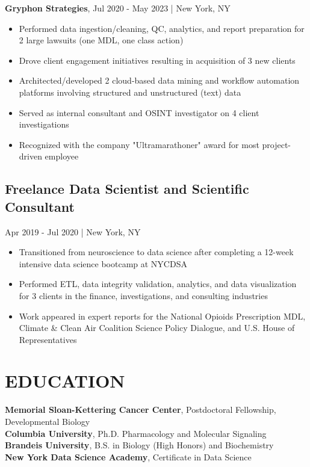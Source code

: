 \documentclass[11pt]{article}
\newenvironment{myitemize}
{ \begin{itemize}
	\setlength{\itemsep}{0pt}
	\setlength{\parskip}{0pt}
	\setlength{\parsep}{0pt}     }
{ \end{itemize}                  }
\begin{document}
{\bfseries Gryphon Strategies}, Jul 2020 - May 2023 | New York, NY
\begin{myitemize}
	\item Performed data ingestion/cleaning, QC, analytics, and report preparation for 2 large lawsuits (one MDL, one class action)
	\item Drove client engagement initiatives resulting in acquisition of 3 new clients
	\item Architected/developed 2 cloud-based data mining and workflow automation platforms involving structured and unstructured (text) data
	\item Served as internal consultant and OSINT investigator on 4 client investigations
	\item Recognized with the company "Ultramarathoner" award for most project-driven employee
\end{myitemize}

\subsection*{Freelance Data Scientist and Scientific Consultant}
\vspace{-2truemm} 
Apr 2019 - Jul 2020 | New York, NY
\begin{myitemize}
	\item Transitioned from neuroscience to data science after completing a 12-week intensive data science bootcamp at NYCDSA 
	\item Performed ETL, data integrity validation, analytics, and data visualization for 3 clients in the finance, investigations, and consulting industries
	\item Work appeared in expert reports for the National Opioids Prescription MDL, Climate \& Clean Air Coalition Science Policy Dialogue, and U.S. House of Representatives 
\end{myitemize}

\section*{EDUCATION}
\vspace{-3truemm}

{\bfseries Memorial Sloan-Kettering Cancer Center}, Postdoctoral Fellowship, Developmental Biology\\
{\bfseries Columbia University}, Ph.D. Pharmacology and Molecular Signaling \\
{\bfseries Brandeis University}, B.S. in Biology (High Honors) and Biochemistry \\
{\bfseries New York Data Science Academy}, Certificate in Data Science
\end{document}
